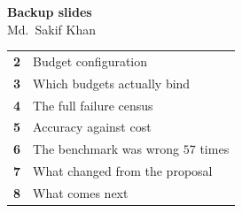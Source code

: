 %
%
%

{
\begin{frame}[plain]
  \vfill
  \centering
  {\Large\bfseries\color{agrdark} Backup slides}\\[3mm]
  {\large Md.\ Sakif Khan }\\[6mm]
  \begin{minipage}{0.72\textwidth}
    \small
    \begin{tabular}{@{}rL{76mm}@{}}
      \textbf{2} & Budget configuration \\
      \textbf{3} & Which budgets actually bind \\
      \textbf{4} & The full failure census \\
      \textbf{5} & Accuracy against cost \\
      \textbf{6} & The benchmark was wrong $57$ times \\
      \textbf{7} & What changed from the proposal \\
      \textbf{8} & What comes next \\
    \end{tabular}
  \end{minipage}
  \vfill
\end{frame}}

